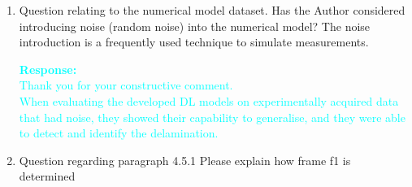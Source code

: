 \documentclass[11pt,a2paper]{report}
\begin{document}
{\begin{enumerate}
		\textcolor{Cyan}{
			\textbf{Response:} \\
			Thank you for your constructive comment. \\
			The overfitting problem in model selection can, in my opinion, be partially solved using the K-folds cross-validation technique.
			It is important to note that this technique was only used in conjunction with the one-to-one RMS-based approach (FCN models for delamination identification).
			The results of applying the K-folds technique compared to when it is not applied are shown in Figure 5.8, which presents a comparison of the experimental cases by using the adaptive wavenumber filtering method [44, 47], FCN-DenseNet [164], and FCN-DenseNet [167].
			Figure 5.8 (c) shows the predicted output of FCN-DenseNet without applying the K-folds technique, as presented in [164], while Fig. 5.8 (d) shows the predicted output when the K-folds technique is applied, as presented in [167].
			I can confirm that applying the K-folds technique improved the prediction performance and the generalization capability of the same implemented model based on the results of both approaches (with and without K-folds).
		}
		
		\item Question relating to the numerical model dataset. 
		Has the Author considered introducing noise (random noise) into the numerical model? The noise introduction is a frequently used technique to simulate measurements.
		
		\textcolor{Cyan}{
			\textbf{Response:} \\
			Thank you for your constructive comment. \\
			When evaluating the developed DL models on experimentally acquired data that had noise, they showed their capability to generalise, and they were able to detect and identify the delamination.	
		}
		
		\item Question regarding paragraph 4.5.1 Please explain how frame f1 is
		determined
		

\end{enumerate}}
\end{document}
